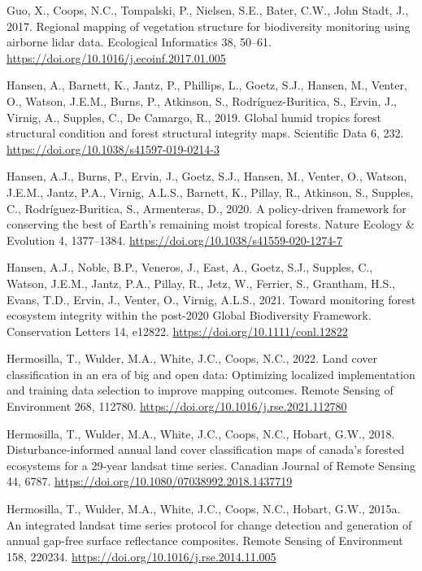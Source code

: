 \documentclass[
]{agujournal2019}
\newlength{\cslhangindent}
\newenvironment{CSLReferences}[2] %
 {\begin{list}{}{%
  \setlength{\itemindent}{0pt}
  \setlength{\leftmargin}{0pt}
  \setlength{\parsep}{0pt}
  \ifodd #1
   \setlength{\leftmargin}{\cslhangindent}
   \setlength{\itemindent}{-1\cslhangindent}
  \fi
  \setlength{\itemsep}{#2\baselineskip}}}
 {\end{list}}
\begin{document}
\begin{CSLReferences}{1}{0}
Guo, X., Coops, N.C., Tompalski, P., Nielsen, S.E., Bater, C.W., John
Stadt, J., 2017. Regional mapping of vegetation structure for
biodiversity monitoring using airborne lidar data. Ecological
Informatics 38, 50--61.
\url{https://doi.org/10.1016/j.ecoinf.2017.01.005}

Hansen, A., Barnett, K., Jantz, P., Phillips, L., Goetz, S.J., Hansen,
M., Venter, O., Watson, J.E.M., Burns, P., Atkinson, S.,
Rodríguez-Buritica, S., Ervin, J., Virnig, A., Supples, C., De Camargo,
R., 2019. Global humid tropics forest structural condition and forest
structural integrity maps. Scientific Data 6, 232.
\url{https://doi.org/10.1038/s41597-019-0214-3}

Hansen, A.J., Burns, P., Ervin, J., Goetz, S.J., Hansen, M., Venter, O.,
Watson, J.E.M., Jantz, P.A., Virnig, A.L.S., Barnett, K., Pillay, R.,
Atkinson, S., Supples, C., Rodríguez-Buritica, S., Armenteras, D., 2020.
A policy-driven framework for conserving the best of Earth{'}s remaining
moist tropical forests. Nature Ecology \& Evolution 4, 1377--1384.
\url{https://doi.org/10.1038/s41559-020-1274-7}

Hansen, A.J., Noble, B.P., Veneros, J., East, A., Goetz, S.J., Supples,
C., Watson, J.E.M., Jantz, P.A., Pillay, R., Jetz, W., Ferrier, S.,
Grantham, H.S., Evans, T.D., Ervin, J., Venter, O., Virnig, A.L.S.,
2021. Toward monitoring forest ecosystem integrity within the post-2020
Global Biodiversity Framework. Conservation Letters 14, e12822.
\url{https://doi.org/10.1111/conl.12822}

Hermosilla, T., Wulder, M.A., White, J.C., Coops, N.C., 2022. Land cover
classification in an era of big and open data: Optimizing localized
implementation and training data selection to improve mapping outcomes.
Remote Sensing of Environment 268, 112780.
\url{https://doi.org/10.1016/j.rse.2021.112780}

Hermosilla, T., Wulder, M.A., White, J.C., Coops, N.C., Hobart, G.W.,
2018. Disturbance-informed annual land cover classification maps of
canada's forested ecosystems for a 29-year landsat time series. Canadian
Journal of Remote Sensing 44, 6787.
\url{https://doi.org/10.1080/07038992.2018.1437719}

Hermosilla, T., Wulder, M.A., White, J.C., Coops, N.C., Hobart, G.W.,
2015a. An integrated landsat time series protocol for change detection
and generation of annual gap-free surface reflectance composites. Remote
Sensing of Environment 158, 220234.
\url{https://doi.org/10.1016/j.rse.2014.11.005}


\end{CSLReferences}
\end{document}

